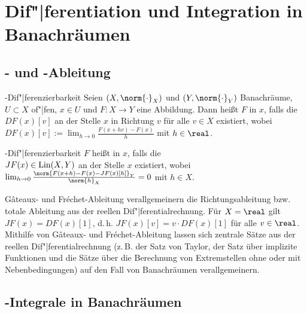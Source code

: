 \chapter{%
    Dif"|ferentiation und Integration in Banachräumen%
}

\section{%
    - und -Ableitung%
}

\begin{Def}{-Dif"|ferenzierbarkeit}
    Seien $(X, \norm{\cdot}_X)$ und $(Y, \norm{\cdot}_Y)$ Banachräume,
    $U \subset X$ of"|fen, $x \in U$ und $F\colon X \rightarrow Y$ eine Abbildung.
    Dann heißt $F$  in $x$,
    falls die  $DF(x)[v]$
    an der Stelle $x$ in Richtung $v$ für alle $v \in X$ existiert, wobei\\
    $DF(x)[v] := \lim_{h \to 0} \frac{F(x + hv) - F(x)}{h}$ mit $h \in \real$.
\end{Def}

\begin{Def}{-Dif"|ferenzierbarkeit}
    $F$ heißt  in $x$, falls die\\
     $JF(x) \in \operatorname{Lin}(X, Y)$
    an der Stelle $x$ existiert, wobei\\
    $\lim_{h \to 0} \frac{\norm{F(x + h) - F(x) - JF(x)[h]}_Y}{\norm{h}_X} = 0$ mit $h \in X$.
\end{Def}

\begin{Bem}
    Gâteaux- und Fréchet-Ableitung verallgemeinern die Richtungsableitung bzw. totale Ableitung
    aus der reellen Dif"|ferentialrechnung.
    Für $X = \real$ gilt $JF(x) = DF(x)[1]$,
    d.\,h. $JF(x)[v] = v \cdot DF(x)[1]$ für alle $v \in \real$.
    Mithilfe von Gâteaux- und Fréchet-Ableitung lassen sich zentrale Sätze aus der
    reellen Dif"|ferentialrechnung
    (z.\,B. der Satz von Taylor, der Satz über implizite Funktionen und die Sätze über die
    Berechnung von Extremstellen ohne oder mit Nebenbedingungen)
    auf den Fall von Banachräumen verallgemeinern.
\end{Bem}

\section{%
    -Integrale in Banachräumen
}

